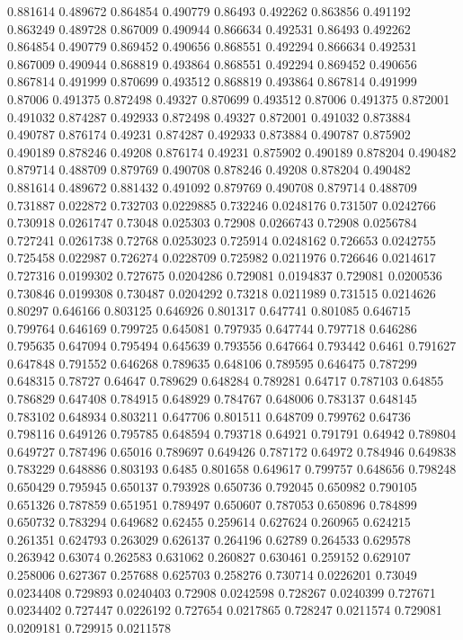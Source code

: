 0.881614 0.489672
0.864854 0.490779
0.86493 0.492262
0.863856 0.491192
0.863249 0.489728
0.867009 0.490944
0.866634 0.492531
0.86493 0.492262
0.864854 0.490779
0.869452 0.490656
0.868551 0.492294
0.866634 0.492531
0.867009 0.490944
0.868819 0.493864
0.868551 0.492294
0.869452 0.490656
0.867814 0.491999
0.870699 0.493512
0.868819 0.493864
0.867814 0.491999
0.87006 0.491375
0.872498 0.49327
0.870699 0.493512
0.87006 0.491375
0.872001 0.491032
0.874287 0.492933
0.872498 0.49327
0.872001 0.491032
0.873884 0.490787
0.876174 0.49231
0.874287 0.492933
0.873884 0.490787
0.875902 0.490189
0.878246 0.49208
0.876174 0.49231
0.875902 0.490189
0.878204 0.490482
0.879714 0.488709
0.879769 0.490708
0.878246 0.49208
0.878204 0.490482
0.881614 0.489672
0.881432 0.491092
0.879769 0.490708
0.879714 0.488709
0.731887 0.022872
0.732703 0.0229885
0.732246 0.0248176
0.731507 0.0242766
0.730918 0.0261747
0.73048 0.025303
0.72908 0.0266743
0.72908 0.0256784
0.727241 0.0261738
0.72768 0.0253023
0.725914 0.0248162
0.726653 0.0242755
0.725458 0.022987
0.726274 0.0228709
0.725982 0.0211976
0.726646 0.0214617
0.727316 0.0199302
0.727675 0.0204286
0.729081 0.0194837
0.729081 0.0200536
0.730846 0.0199308
0.730487 0.0204292
0.73218 0.0211989
0.731515 0.0214626
0.80297 0.646166
0.803125 0.646926
0.801317 0.647741
0.801085 0.646715
0.799764 0.646169
0.799725 0.645081
0.797935 0.647744
0.797718 0.646286
0.795635 0.647094
0.795494 0.645639
0.793556 0.647664
0.793442 0.6461
0.791627 0.647848
0.791552 0.646268
0.789635 0.648106
0.789595 0.646475
0.787299 0.648315
0.78727 0.64647
0.789629 0.648284
0.789281 0.64717
0.787103 0.64855
0.786829 0.647408
0.784915 0.648929
0.784767 0.648006
0.783137 0.648145
0.783102 0.648934
0.803211 0.647706
0.801511 0.648709
0.799762 0.64736
0.798116 0.649126
0.795785 0.648594
0.793718 0.64921
0.791791 0.64942
0.789804 0.649727
0.787496 0.65016
0.789697 0.649426
0.787172 0.64972
0.784946 0.649838
0.783229 0.648886
0.803193 0.6485
0.801658 0.649617
0.799757 0.648656
0.798248 0.650429
0.795945 0.650137
0.793928 0.650736
0.792045 0.650982
0.790105 0.651326
0.787859 0.651951
0.789497 0.650607
0.787053 0.650896
0.784899 0.650732
0.783294 0.649682
0.62455 0.259614
0.627624 0.260965
0.624215 0.261351
0.624793 0.263029
0.626137 0.264196
0.62789 0.264533
0.629578 0.263942
0.63074 0.262583
0.631062 0.260827
0.630461 0.259152
0.629107 0.258006
0.627367 0.257688
0.625703 0.258276
0.730714 0.0226201
0.73049 0.0234408
0.729893 0.0240403
0.72908 0.0242598
0.728267 0.0240399
0.727671 0.0234402
0.727447 0.0226192
0.727654 0.0217865
0.728247 0.0211574
0.729081 0.0209181
0.729915 0.0211578

